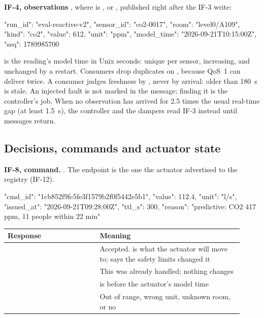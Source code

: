\textbf{IF-4, observations} , where
 is ,  or , published right
after the IF-3 write:

\begin{json}
{"run_id": "eval-reactive-v2", "sensor_id": "co2-0017", "room": "level0/A109",
 "kind": "co2", "value": 612, "unit": "ppm",
 "model_time": "2026-09-21T10:15:00Z", "seq": 1789985700}
\end{json}

 is the reading's model time in Unix seconds: unique per sensor,
increasing, and unchanged by a restart. Consumers drop duplicates on
, because QoS~1 can deliver twice. A consumer judges
freshness by , never by arrival: older than 180~s is stale.
An injected fault is not marked in the message; finding it is the controller's
job. When no observation has arrived for 2.5 times the usual real-time gap (at
least 1.5~s), the controller and the dampers read IF-3 instead until messages
return.

\subsection{Decisions, commands and actuator state}

\textbf{IF-8, command.}
. The
endpoint is the one the actuator advertised to the registry (IF-12).

\begin{json}
{"cmd_id": "1cb852f9fc5fe3f1579b2f0f5442e5b1", "value": 112.4, "unit": "l/s",
 "issued_at": "2026-09-21T09:28:00Z", "ttl_s": 300,
 "reason": "predictive: CO2 417 ppm, 11 people within 22 min"}
\end{json}

\begin{longtable}[]{@{}L{0.36\linewidth}L{0.56\linewidth}@{}}
\toprule
\textbf{Response} & \textbf{Meaning} \\
\midrule
\endhead
{} & Accepted.  is what the actuator will move to;  says the safety limits changed it \\
 & This  was already handled; nothing changes \\
 &  is before the actuator's model time \\
 & Out of range, wrong unit, unknown room, or no  \\
\bottomrule
\end{longtable}

